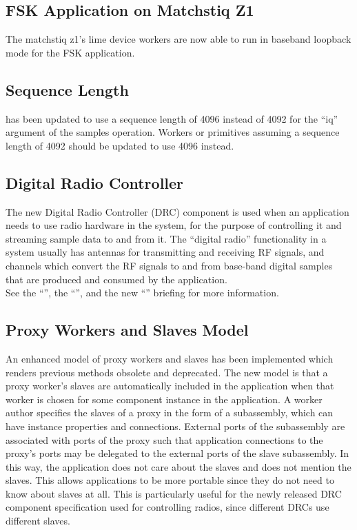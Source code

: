 \subsection{FSK Application on Matchstiq Z1}
\label{sec:21_fsk_application}
The matchstiq z1's lime device workers are now able to run in baseband loopback mode for the FSK application.

\subsection{ Sequence Length}
\label{sec:21_seq_length}
 has been updated to use a sequence length of 4096 instead of 4092 for the ``iq'' argument of the samples operation.  Workers or primitives assuming a sequence length of 4092 should be updated to use 4096 instead.

\subsection{Digital Radio Controller}
\label{sec:21_drc}
The new Digital Radio Controller (DRC) component is used when an application needs to use radio hardware in the system, for the purpose of controlling it and streaming sample data to and from it.  The “digital radio” functionality in a system usually has antennas for transmitting and receiving RF signals, and channels which convert the RF signals to and from base-band digital samples that are produced and consumed by the application.\\

See the ``'', the ``'', and the new ``'' briefing for more information.

\subsection{Proxy Workers and Slaves Model}
\label{sec:21_infer_slaves}
An enhanced model of proxy workers and slaves has been implemented which renders previous methods obsolete and deprecated.  The new model is that a proxy worker's slaves are automatically included in the application when that worker is chosen for some component instance in the application.  A worker author specifies the slaves of a proxy in the form of a subassembly, which can have instance properties and connections.  External ports of the subassembly are associated with ports of the proxy such that application connections to the proxy's ports may be delegated to the external ports of the slave subassembly.
In this way, the application does not care about the slaves and does not mention the slaves.  This allows applications to be more portable since they do not need to know about slaves at all.  This is particularly useful for the newly released DRC component specification used for controlling radios, since different DRCs use different slaves.\\

